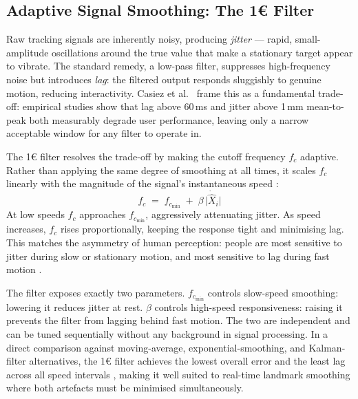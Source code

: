 \subsection{Adaptive Signal Smoothing: The \texorpdfstring{1\euro{}}{1-Euro} Filter}
\label{subsec:one_euro_filter}

Raw tracking signals are inherently noisy, producing \emph{jitter} ---
rapid, small-amplitude oscillations around the true value that make
a stationary target appear to vibrate.
The standard remedy, a low-pass filter, suppresses high-frequency
noise but introduces \emph{lag}: the filtered output responds
sluggishly to genuine motion, reducing interactivity.
Casiez et al.\ \cite{casiez2012oneeuro} frame this as a fundamental
trade-off: empirical studies show that lag above 60\,ms and jitter
above 1\,mm mean-to-peak both measurably degrade user performance,
leaving only a narrow acceptable window for any filter to operate in.

The 1\euro{} filter resolves the trade-off by making the cutoff
frequency $f_c$ adaptive.
Rather than applying the same degree of smoothing at all times, it
scales $f_c$ linearly with the magnitude of the signal's instantaneous
speed \cite{casiez2012oneeuro}:
%
\begin{equation}
    f_c \;=\; f_{c_{\min}} \;+\; \beta\,\bigl|\dot{\hat{X}}_i\bigr|
    \label{eq:one_euro}
\end{equation}
%
At low speeds $f_c$ approaches $f_{c_{\min}}$, aggressively
attenuating jitter.
As speed increases, $f_c$ rises proportionally, keeping the response
tight and minimising lag.
This matches the asymmetry of human perception: people are most
sensitive to jitter during slow or stationary motion, and most
sensitive to lag during fast motion \cite{casiez2012oneeuro}.

The filter exposes exactly two parameters.
$f_{c_{\min}}$ controls slow-speed smoothing: lowering it reduces
jitter at rest.
$\beta$ controls high-speed responsiveness: raising it prevents the
filter from lagging behind fast motion.
The two are independent and can be tuned sequentially without any
background in signal processing.
In a direct comparison against moving-average, exponential-smoothing,
and Kalman-filter alternatives, the 1\euro{} filter achieves the
lowest overall error and the least lag across all speed intervals
\cite{casiez2012oneeuro}, making it well suited to real-time
landmark smoothing where both artefacts must be minimised
simultaneously.
